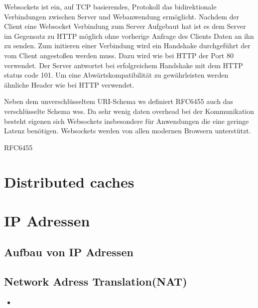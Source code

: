Websockets ist ein, auf TCP basierendes, Protokoll das bidirektionale Verbindungen zwischen Server und Webanwendung ermöglicht. Nachdem der Client eine Websocket Verbindung zum Server Aufgebaut hat ist es dem Server im Gegensatz zu HTTP möglich ohne vorherige Anfrage des Clients Daten an ihn zu senden. Zum initieren einer Verbindung wird ein Handshake durchgeführt der vom Client angestoßen werden muss. Dazu wird wie bei HTTP der Port 80 verwendet. Der Server antwortet bei erfolgreichem Handshake mit dem HTTP status code 101. Um eine Abwärtskompatibilität zu gewährleisten werden ähnliche Header wie bei HTTP verwendet.

Neben dem unverschlüsseltem URI-Schema ws definiert RFC6455\cite{rfcWebsockets} auch das verschlüsselte Schema wss. Da  sehr wenig daten overhead bei der Kommunikation besteht eigenen sich Websockets insbesondere für Anwendungen die eine geringe Latenz benötigen. Websockets werden von allen modernen Browsern unterstützt.

%
%
%
% 
%  


RFC6455\cite{rfcWebsockets}


\section{Distributed caches}
\section{IP Adressen}
\subsection{Aufbau von IP Adressen}
\subsection{Network Adress Translation(NAT)}
\begin{itemize}
	\item 
\end{itemize}

